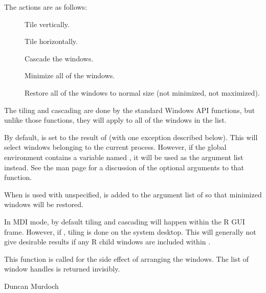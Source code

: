 \begin{Details}\relax
The actions are as follows:
\begin{description}

\item[] Tile vertically.
\item[] Tile horizontally.
\item[] Cascade the windows.
\item[] Minimize all of the windows.
\item[] Restore all of the windows to normal size (not minimized, not maximized).

\end{description}

The tiling and cascading are done by the standard Windows API functions, but unlike those functions,
they will apply to all of the windows in the  list.  

By default,  is set to the result of
 (with one exception described
below).  This will select windows belonging to the current \R{} process.
However, if the global environment contains a variable named
, it will be used as the argument list
instead. See the  man page for a
discussion of the optional arguments to that function.

When  is used with  unspecified,
 is added to the argument list of
 so that minimized windows will be restored.

In MDI mode, by default tiling and cascading will happen within the R
GUI frame. However, if , tiling is done on the system
desktop. This will generally not give desirable results if any R child
windows are included within .

\end{Details}
%
\begin{Value}
This function is called for the side effect of arranging the windows.
The list of window handles is returned invisibly.
\end{Value}
%
\begin{Author}\relax
Duncan Murdoch
\end{Author}
%
\begin{SeeAlso}\relax
{}
\end{SeeAlso}
